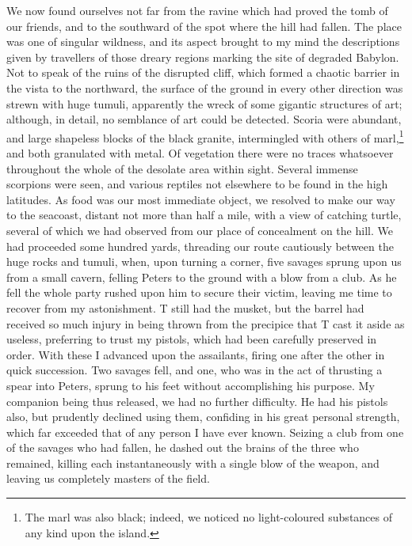 We now found ourselves not far from the ravine which had proved the tomb of
our friends, and to the southward of the spot where the hill had fallen. The
place was one of singular wildness, and its aspect brought to my mind the
descriptions given by travellers of those dreary regions marking the site of
degraded Babylon. Not to speak of the ruins of the disrupted cliff, which formed
a chaotic barrier in the vista to the northward, the surface of the ground in
every other direction was strewn with huge tumuli, apparently the wreck of some
gigantic structures of art; although, in detail, no semblance of art could be
detected. Scoria were abundant, and large shapeless blocks of the black granite,
intermingled with others of marl,\footnote{
The marl was also black; indeed, we noticed no light-coloured substances of any 
kind upon the island.}
and both granulated with metal. Of
vegetation there were no traces whatsoever throughout the whole of the desolate
area within sight. Several immense scorpions were seen, and various reptiles not
elsewhere to be found in the high latitudes. As food was our most immediate
object, we resolved to make our way to the seacoast, distant not more than half
a mile, with a view of catching turtle, several of which we had observed from
our place of concealment on the hill. We had proceeded some hundred yards,
threading our route cautiously between the huge rocks and tumuli, when, upon
turning a corner, five savages sprung upon us from a small cavern, felling
Peters to the ground with a blow from a club. As he fell the whole party rushed
upon him to secure their victim, leaving me time to recover from my
astonishment. T still had the musket, but the barrel had received so much injury
in being thrown from the precipice that T cast it aside as useless, preferring
to trust my pistols, which had been carefully preserved in order. With these I
advanced upon the assailants, firing one after the other in quick succession.
Two savages fell, and one, who was in the act of thrusting a spear into Peters,
sprung to his feet without accomplishing his purpose. My companion being thus
released, we had no further difficulty. He had his pistols also, but prudently
declined using them, confiding in his great personal strength, which far
exceeded that of any person I have ever known. Seizing a club from one of the
savages who had fallen, he dashed out the brains of the three who remained,
killing each instantaneously with a single blow of the weapon, and leaving us
completely masters of the field. 

